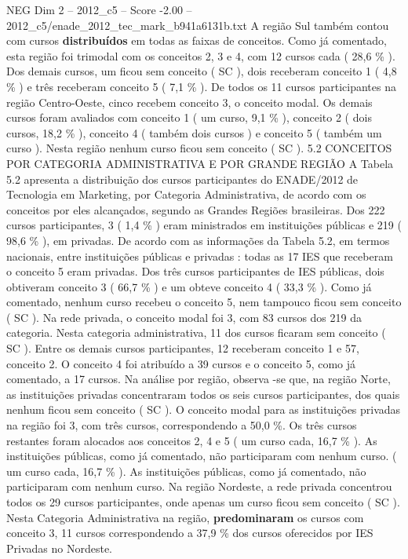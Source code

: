 \begin{textsample}{NEG Dim 2 – 2012\_c5 – Score -2.00 – 2012\_c5/enade\_2012\_tec\_mark\_b941a6131b.txt}
A região Sul também contou com cursos \textbf{distribuídos} em todas as faixas de conceitos.
Como já comentado, esta região foi trimodal com os conceitos 2, 3 e 4, com 12 cursos cada ( 28,6 \% ).
Dos demais cursos, um ficou sem conceito ( SC ), dois receberam conceito 1 ( 4,8 \% ) e três receberam conceito 5 ( 7,1 \% ).
De todos os 11 cursos participantes na região Centro-Oeste, cinco recebem conceito 3, o conceito modal.
Os demais cursos foram avaliados com conceito 1 ( um curso, 9,1 \% ), conceito 2 ( dois cursos, 18,2 \% ), conceito 4 ( também dois cursos ) e conceito 5 ( também um curso ).
Nesta região nenhum curso ficou sem conceito ( SC ). 5.2 CONCEITOS POR CATEGORIA ADMINISTRATIVA E POR GRANDE REGIÃO A Tabela 5.2 apresenta a distribuição dos cursos participantes do ENADE/2012 de Tecnologia em Marketing, por Categoria Administrativa, de acordo com os conceitos por eles alcançados, segundo as Grandes Regiões brasileiras.
Dos 222 cursos participantes, 3 ( 1,4 \% ) eram ministrados em instituições públicas e 219 ( 98,6 \% ), em privadas.
De acordo com as informações da Tabela 5.2, em termos nacionais, entre instituições públicas e privadas : todas as 17 IES que receberam o conceito 5 eram privadas.
Dos três cursos participantes de IES públicas, dois obtiveram conceito 3 ( 66,7 \% ) e um obteve conceito 4 ( 33,3 \% ).
Como já comentado, nenhum curso recebeu o conceito 5, nem tampouco ficou sem conceito ( SC ).
Na rede privada, o conceito modal foi 3, com 83 cursos dos 219 da categoria.
Nesta categoria administrativa, 11 dos cursos ficaram sem conceito ( SC ).
Entre os demais cursos participantes, 12 receberam conceito 1 e 57, conceito 2.
O conceito 4 foi atribuído a 39 cursos e o conceito 5, como já comentado, a 17 cursos.
Na análise por região, observa -se que, na região Norte, as instituições privadas concentraram todos os seis cursos participantes, dos quais nenhum ficou sem conceito ( SC ).
O conceito modal para as instituições privadas na região foi 3, com três cursos, correspondendo a 50,0 \%.
Os três cursos restantes foram alocados aos conceitos 2, 4 e 5 ( um curso cada, 16,7 \% ).
As instituições públicas, como já comentado, não participaram com nenhum curso. ( um curso cada, 16,7 \% ).
As instituições públicas, como já comentado, não participaram com nenhum curso.
Na região Nordeste, a rede privada concentrou todos os 29 cursos participantes, onde apenas um curso ficou sem conceito ( SC ).
Nesta Categoria Administrativa na região, \textbf{predominaram} os cursos com conceito 3, 11 cursos correspondendo a 37,9 \% dos cursos oferecidos por IES Privadas no Nordeste.

\end{textsample}
